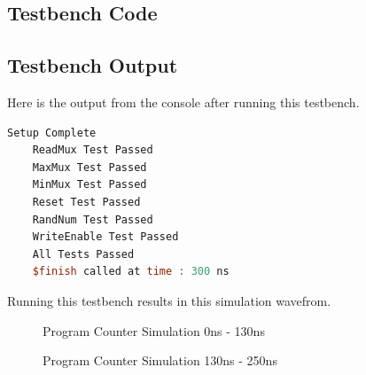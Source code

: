 \documentclass[
    a4paper, %
	12pt, %
    ]{CSSullivanBusinessReport}
\begin{document}
\begin{fullwidth}
\captionsetup{style=widetable}
\subsection{Testbench Code} %



\subsection{Testbench Output} %
Here is the output from the console after running this testbench.

\begin{lstlisting}[language=Verilog, caption=TCl Output from ProgramCounterEnv\_TB]
    Setup Complete
    ReadMux Test Passed
    MaxMux Test Passed
    MinMux Test Passed
    Reset Test Passed
    RandNum Test Passed
    WriteEnable Test Passed
    All Tests Passed
    $finish called at time : 300 ns
\end{lstlisting}

Running this testbench results in this simulation wavefrom.

\begin{figure}[H]
    \centering
    \captionsetup{style=widetable}
    \caption{Program Counter Simulation 0ns - 130ns}
    \label{fig:PCSimulation}
\end{figure}

\begin{figure}[H]
    \centering
    \captionsetup{style=widetable}
    \caption{Program Counter Simulation 130ns - 250ns}
    \label{fig:PCSimulation}
\end{figure}


\end{fullwidth}
\end{document}
